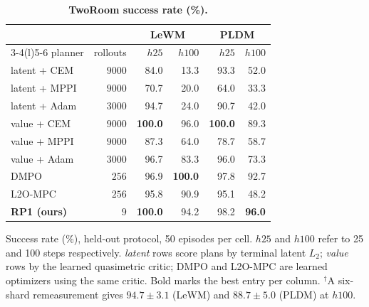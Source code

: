 \begin{table}[t]
  \centering
  \captionsetup{font=small,skip=4pt}
  \caption{\textbf{TwoRoom success rate (\%).}}
  \label{tab:tworoom}
  \footnotesize
  \renewcommand{\arraystretch}{1.08}
  \begin{tabular*}{\linewidth}{
    @{\extracolsep{\fill}}lrrrrr@{}
  }
  \toprule
  & & \multicolumn{2}{c}{LeWM} & \multicolumn{2}{c}{PLDM} \\
  \cmidrule(lr){3-4}\cmidrule(l){5-6}
  planner & rollouts & $h25$ & $h100$ & $h25$ & $h100$ \\
  \midrule
  latent + CEM   & $9000$ & 84.0 & 13.3 & 93.3 & 52.0 \\
  latent + MPPI  & $9000$ & 70.7 & 20.0 & 64.0 & 33.3 \\
  latent + Adam  & $3000$ & 94.7 & 24.0 & 90.7 & 42.0 \\
  \midrule
  value + CEM    & $9000$ & \textbf{100.0} & 96.0\rlap{$^{\dagger}$} & \textbf{100.0} & 89.3\rlap{$^{\dagger}$} \\
  value + MPPI   & $9000$ & 87.3 & 64.0 & 78.7 & 58.7 \\
  value + Adam   & $3000$ & 96.7 & 83.3 & 96.0 & 73.3 \\
  \midrule
  DMPO           & $256$  & 96.9 & \textbf{100.0} & 97.8 & 92.7 \\
  L2O-MPC        & $256$  & 95.8 & 90.9 & 95.1 & 48.2 \\
  \midrule
  \textbf{RP1 (ours)} & $9$
  & \textbf{100.0} & 94.2
  & 98.2 & \textbf{96.0} \\
  \bottomrule
  \end{tabular*}

  \vspace{3pt}
  {\footnotesize\setlength{\parindent}{0pt}\raggedright
  \indent Success rate (\%), held-out protocol, 50 episodes per cell.
  $h25$ and $h100$ refer to 25 and 100 steps respectively. \emph{latent} rows
  score plans by terminal latent $L_2$; \emph{value} rows by the learned
  quasimetric critic; DMPO and L2O-MPC are learned optimizers using the same
  critic. Bold marks the best entry per column.
  $^{\dagger}$A six-shard remeasurement gives $94.7 \pm 3.1$ (LeWM) and
  $88.7 \pm 5.0$ (PLDM) at $h100$.\par}
\end{table}

